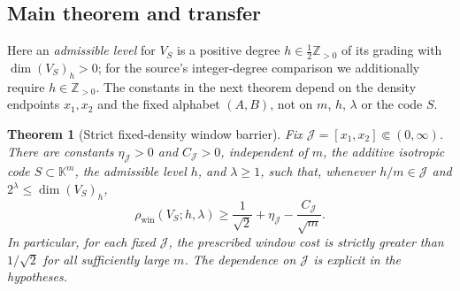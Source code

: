 \documentclass[10pt,a4paper]{article}
\numberwithin{equation}{section}
\newtheorem{theorem}{Theorem}[section]
\theoremstyle{remark}\newtheorem{remark}[theorem]{Remark}\newtheorem{question}[theorem]{Question}
\newcommand{\rhow}{\rho_{\mathrm{win}}}\newcommand{\F}{\mathbb F}\newcommand{\K}{\mathbb K}\newcommand{\Z}{\mathbb Z}\newcommand{\R}{\mathbb R}\newcommand{\cB}{\mathcal L}\newcommand{\wt}{\mathrm{wt}}\newcommand{\dimn}{\operatorname{dim}}\newcommand{\supp}{\operatorname{supp}}
\begin{document}
\subsection{Main theorem and transfer}
Here an \emph{admissible level} for $V_S$ is a positive degree $h\in\frac12\Z_{>0}$ of its grading with $\dimn(V_S)_h>0$; for the source's integer-degree comparison we additionally require $h\in\Z_{>0}$. The constants in the next theorem depend on the density endpoints $x_1,x_2$ and the fixed alphabet $(A,B)$, not on $m$, $h$, $\lambda$ or the code $S$.

\begin{theorem}[Strict fixed-density window barrier]\label{thm:strict}
Fix $\mathcal J=[x_1,x_2]\Subset(0,\infty)$. There are constants
$\eta_{\mathcal J}>0$ and $C_{\mathcal J}>0$, independent of
$m$, the additive isotropic code $S\subset\K^m$, the admissible level $h$,
and $\lambda\ge1$, such that, whenever $h/m\in\mathcal J$ and
$2^\lambda\le\dimn(V_S)_h$,
\begin{equation}\label{eq:strict-main}
\rhow(V_S;h,\lambda)\ge\frac1{\sqrt2}+\eta_{\mathcal J}-\frac{C_{\mathcal J}}{\sqrt m}.
\end{equation}
In particular, for each fixed $\mathcal J$, the prescribed window cost is
strictly greater than $1/\sqrt2$ for all sufficiently large $m$.
The dependence on $\mathcal J$ is explicit in the hypotheses.
\end{theorem}
\end{document}
